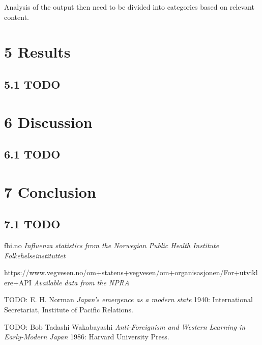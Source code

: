 \documentclass[11pt]{report}
\begin{document}
Analysis of the output then need to be divided into categories based on relevant content.

\chapter*{\vspace{-3cm}5 Results}

\section*{5.1 TODO}

\chapter*{\vspace{-3cm}6 Discussion}

\section*{6.1 TODO}

\chapter*{\vspace{-3cm}7 Conclusion}

\section*{7.1 TODO}

\begin{thebibliography}{1}

 fhi.no {\em Influenza statistics from the Norwegian Public Health Institute 		Folkehelseinstituttet}

 https://www.vegvesen.no/om+statens+vegvesen/om+organisasjonen/For+utviklere+API {\em Available data from the NPRA}

 TODO: E. H. Norman {\em Japan's emergence as a modern state} 1940: International Secretariat, Institute of Pacific Relations.

 TODO: Bob Tadashi Wakabayashi {\em Anti-Foreignism and Western Learning in Early-Modern Japan} 1986: Harvard University Press.

\end{thebibliography}
\end{document}
